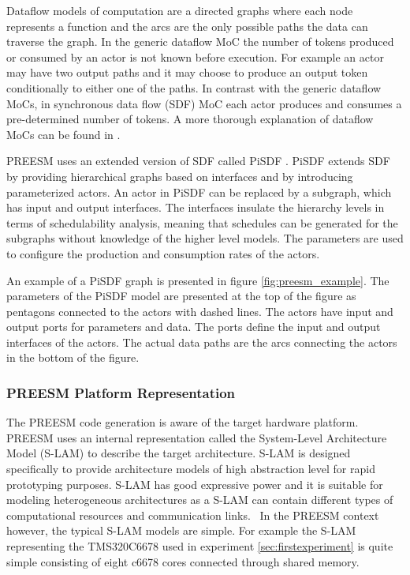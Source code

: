 Dataflow models of computation are a directed graphs where each node represents a function and the arcs are the only possible paths the data can traverse the graph. In the generic dataflow MoC the number of tokens produced or consumed by an actor is not known before execution. For example an actor may have two output paths and it may choose to produce an output token conditionally to either one of the paths. In contrast with the generic dataflow MoCs, in synchronous data flow (SDF) MoC each actor produces and consumes a pre-determined number of tokens. \cite{lee1987synchronous} A more thorough explanation of dataflow MoCs can be found in \cite{lee2015introduction}.

PREESM uses an extended version of SDF called PiSDF \cite{pelcat2014preesm}. PiSDF extends SDF by providing hierarchical graphs based on interfaces and by introducing parameterized actors. An actor in PiSDF can be replaced by a subgraph, which has input and output interfaces. The interfaces insulate the hierarchy levels in terms of schedulability analysis, meaning that schedules can be generated for the subgraphs without knowledge of the higher level models. The parameters are used to configure the production and consumption rates of the actors.~\cite{desnos2013pimm}

An example of a PiSDF graph is presented in figure \ref{fig:preesm_example}. The parameters of the PiSDF model are presented at the top of the figure as pentagons connected to the actors with dashed lines. The actors have input and output ports for parameters and data. The ports define the input and output interfaces of the actors. The actual data paths are the arcs connecting the actors in the bottom of the figure.

\subsubsection{PREESM Platform Representation}
\label{subsubsec:preesm-hardware}
The PREESM code generation is aware of the target hardware platform. PREESM uses an internal representation called the System-Level Architecture Model (S-LAM) \cite{pelcat2009system} to describe the target architecture. S-LAM is designed specifically to provide architecture models of high abstraction level for rapid prototyping purposes. S-LAM has good expressive power and it is suitable for modeling heterogeneous architectures as a S-LAM can contain different types of computational resources and communication links.~\cite{pelcat2009system} In the PREESM context however, the typical S-LAM models are simple. For example the S-LAM representing the TMS320C6678 used in experiment \ref{sec:firstexperiment} is quite simple consisting of eight c6678 cores connected through shared memory.

